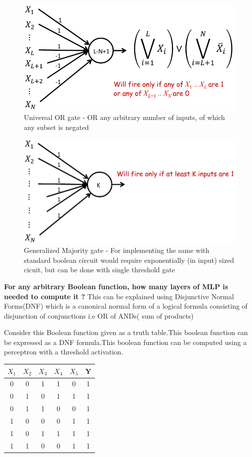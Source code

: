 \documentclass[12pt]{article}
\begin{document}
\begin{figure}[h]
	\centering
	\includegraphics[width=0.4\linewidth]{img/or}
	\caption{Universal OR gate - OR any arbitrary number of inputs, of which any subset is negated}
	\label{fig:and}
\end{figure}

\begin{figure}[h]
	\centering
	\includegraphics[width=0.4\linewidth]{img/majority}
	\caption{Generalized Majority gate - For implementing the same with standard boolean circuit would require exponentially (in input) sized cicuit, but can be done with single threshold gate }
	\label{fig:and}
\end{figure}

\cleardoublepage


\textbf{For any arbitrary Boolean function, how many layers of MLP is needed to compute it ?}
This  can be explained using Disjunctive Normal Forms(DNF) which is a canonical normal form of a logical formula consisting of  disjunction of conjunctions i.e OR of ANDs( sum of products)

Consider this Boolean function given as a truth table.This boolean function can be expressed as a DNF formula.This boolean function can be computed using a perceptron with a threshold activation.




	\begin{tabular}{|c|c|c|c|c|c|}
		\hline 
		$X_1$	& $X_2$ & $X_3$ &$X_4$  & $X_5$  & Y  \\ 
		\hline 
		0	& 0 & 1 & 1 & 0 & 1  \\ 
		\hline 
		0	&1  &  0& 1 &  1&1  \\ 
		\hline 
		0	& 1 &  1&  0&  0& 1 \\ 
		\hline 
		1	&  0&  0&  0&  1&  1\\ 
		\hline 
		1	&  0&  1&  1&  1& 1 \\ 
		\hline 
		1	& 1 &  0&  0&  1  & 1 \\
		\hline
		
		
	\end{tabular}
   
\end{document}
